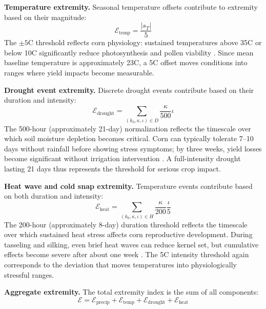 \documentclass[preprint,12pt]{elsarticle}
\newcommand{\df}[2]{\displaystyle\frac{#1}{#2}}
\begin{document}
\textbf{Temperature extremity.} Seasonal temperature offsets contribute to extremity based on their magnitude:
\begin{equation}
\mathcal{E}_{\text{temp}} = \df{|s_{T}|}{5}
\label{eqn:extreme-temp}
\end{equation}
The $\pm 5$\textdegree C threshold reflects corn physiology: sustained temperatures above 35\textdegree C or below 10\textdegree C significantly reduce photosynthesis and pollen viability \cite{hatfield2015temperature}. Since mean baseline temperature is approximately 23\textdegree C, a 5\textdegree C offset moves conditions into ranges where yield impacts become measurable.

\textbf{Drought event extremity.} Discrete drought events contribute based on their duration and intensity:
\begin{equation}
\mathcal{E}_{\text{drought}} = \sum_{(k_{0}, \kappa, \iota)\in D} \df{\kappa}{500}\iota
\label{eqn:extreme-drought}
\end{equation}
The 500-hour (approximately 21-day) normalization reflects the timescale over which soil moisture depletion becomes critical. Corn can typically tolerate 7--10 days without rainfall before showing stress symptoms; by three weeks, yield losses become significant without irrigation intervention \cite{kranz2008irrigation}. A full-intensity drought lasting 21 days thus represents the threshold for serious crop impact.

\textbf{Heat wave and cold snap extremity.} Temperature events contribute based on both duration and intensity:
\begin{equation}
\mathcal{E}_{\text{heat}} = \sum_{(k_{0}, \kappa, \iota)\in H} \df{\kappa}{200}\df{\iota}{5}
\label{eqn:extreme-heatwave}
\end{equation}
The 200-hour (approximately 8-day) duration threshold reflects the timescale over which sustained heat stress affects corn reproductive development. During tasseling and silking, even brief heat waves can reduce kernel set, but cumulative effects become severe after about one week \cite{hatfield2015temperature}. The 5\textdegree C intensity threshold again corresponds to the deviation that moves temperatures into physiologically stressful ranges.

\textbf{Aggregate extremity.} The total extremity index is the sum of all components:
\begin{equation}
\mathcal{E} = \mathcal{E}_{\text{precip}} + \mathcal{E}_{\text{temp}} + \mathcal{E}_{\text{drought}} + \mathcal{E}_{\text{heat}}
\label{eqn:extremity}
\end{equation}
\end{document}
